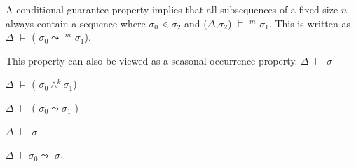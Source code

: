 



\begin{definition}\label{lem:cond_guaran}
\begin{rm}
A conditional guarantee property implies that all subsequences  of
a fixed size $n$ 
always contain a sequence where $\sigma_0 \lessdot \sigma_2$ and
($\Delta$,$\sigma_2$) $\models$ \diam$^{m}$ $\sigma_1$. This is written as
$\Delta$ $\models$  ( $\sigma_0 \leadsto$ \diam$^{m}$ $\sigma_1$).
\end{rm}
\end{definition}



\begin{definition}\label{lem:canresp}
\begin{rm}
This property can also be viewed as a seasonal occurrence property.
$\Delta$ $\models$  $\sigma$
\end{rm}
\end{definition}



\begin{definition}\label{lem:response}
\begin{rm}
$\Delta$ $\models$  ( $\sigma_0 \wedge^k \sigma_1$) 
\end{rm}
\end{definition}



\begin{definition}\label{lem:seasresponse}
\begin{rm}
$\Delta$ $\models$  ( $\sigma_0 \leadsto \sigma_1$ )
\end{rm}
\end{definition}



\begin{definition}\label{lem:persist}
\begin{rm}
$\Delta$ $\models$  $\sigma$
\end{rm}
\end{definition}


\begin{definition}\label{lem:ord_persist}
\begin{rm}
$\Delta$ $\models \sigma_0 \leadsto$  $\sigma_1$
\end{rm}
\end{definition}


